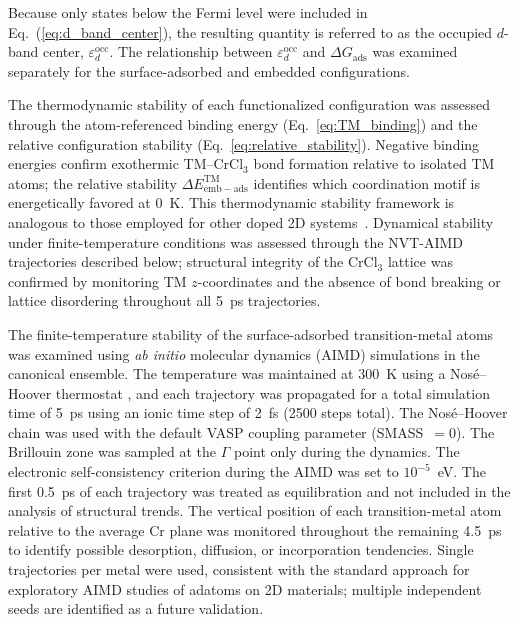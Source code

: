 \documentclass[journal=jacsat,manuscript=article]{achemso}
\begin{document}
Because only states below the Fermi level were included in Eq.~(\ref{eq:d_band_center}), the resulting quantity is referred to as the occupied $d$-band center, $\varepsilon_{d}^{\mathrm{occ}}$. The relationship between $\varepsilon_{d}^{\mathrm{occ}}$ and $\Delta G_{\mathrm{ads}}$ was examined separately for the surface-adsorbed and embedded configurations.

The thermodynamic stability of each functionalized configuration was assessed through the atom-referenced binding energy (Eq.~\ref{eq:TM_binding}) and the relative configuration stability (Eq.~\ref{eq:relative_stability}). Negative binding energies confirm exothermic TM--CrCl$_3$ bond formation relative to isolated TM atoms; the relative stability $\Delta E_{\mathrm{emb-ads}}^{\mathrm{TM}}$ identifies which coordination motif is energetically favored at 0~K. This thermodynamic stability framework is analogous to those employed for other doped 2D systems~\cite{ApplSurfSci2025_161321,PCCP2018_15863,Vacuum2020_109742,Vacuum2020_109438}. Dynamical stability under finite-temperature conditions was assessed through the NVT-AIMD trajectories described below; structural integrity of the CrCl$_3$ lattice was confirmed by monitoring TM $z$-coordinates and the absence of bond breaking or lattice disordering throughout all 5~ps trajectories.

The finite-temperature stability of the surface-adsorbed transition-metal atoms was examined using \textit{ab initio} molecular dynamics (AIMD) simulations in the canonical ensemble. The temperature was maintained at 300~K using a Nosé--Hoover thermostat \cite{Nose1984,Hoover1985}, and each trajectory was propagated for a total simulation time of 5~ps using an ionic time step of 2~fs (2500 steps total). The Nosé--Hoover chain was used with the default VASP coupling parameter (SMASS~$=0$). The Brillouin zone was sampled at the $\Gamma$ point only during the dynamics. The electronic self-consistency criterion during the AIMD was set to $10^{-5}$~eV. The first 0.5~ps of each trajectory was treated as equilibration and not included in the analysis of structural trends. The vertical position of each transition-metal atom relative to the average Cr plane was monitored throughout the remaining 4.5~ps to identify possible desorption, diffusion, or incorporation tendencies. Single trajectories per metal were used, consistent with the standard approach for exploratory AIMD studies of adatoms on 2D materials; multiple independent seeds are identified as a future validation.
\end{document}
